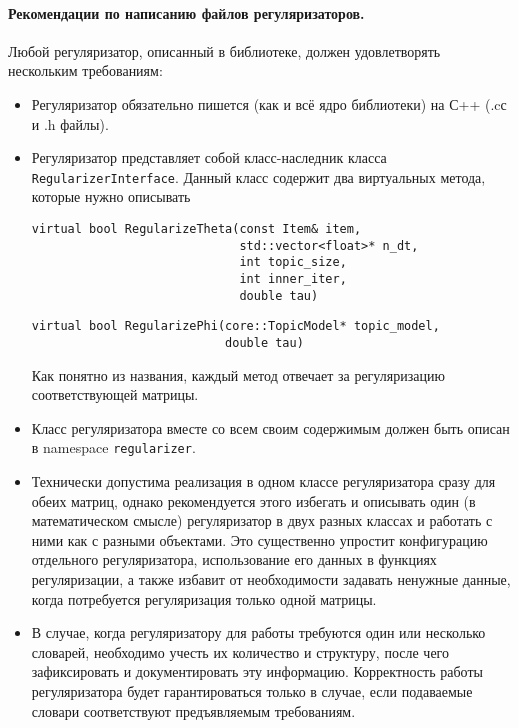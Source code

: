 \paragraph{Рекомендации по написанию файлов регуляризаторов.} Любой регуляризатор, описанный в библиотеке, должен удовлетворять нескольким требованиям:

\begin{itemize}
	\item Регуляризатор обязательно пишется (как и всё ядро библиотеки) на С++ (.cс и .h файлы).

	\item Регуляризатор представляет собой класс-наследник класса \verb'RegularizerInterface'. Данный класс содержит два виртуальных метода, которые нужно описывать
	
	\vspace{10pt}
	\verb|virtual bool RegularizeTheta(const Item& item, | \\
	\verb|                             std::vector<float>* n_dt,| \\
	\verb|                             int topic_size,| \\
	\verb|                             int inner_iter,| \\
	\verb|                             double tau)|
	
	\verb|virtual bool RegularizePhi(core::TopicModel* topic_model, | \\
	\verb|                           double tau)|
	\vspace{10pt}
	
	Как понятно из названия, каждый метод отвечает за регуляризацию соответствующей матрицы.
	
	\item Класс регуляризатора вместе со всем своим содержимым должен быть описан в namespace \verb'regularizer'.
	
	\item Технически допустима реализация в одном классе регуляризатора сразу для обеих матриц, однако рекомендуется этого избегать и описывать один (в математическом смысле) регуляризатор в двух разных классах и работать с ними как с разными объектами. Это существенно упростит конфигурацию отдельного регуляризатора, использование его данных в функциях регуляризации, а также избавит от необходимости задавать ненужные данные, когда потребуется регуляризация только одной матрицы.
	
	\item В случае, когда регуляризатору для работы требуются один или несколько словарей, необходимо учесть их количество и структуру, после чего зафиксировать и документировать эту информацию. Корректность работы регуляризатора будет гарантироваться только в случае, если подаваемые словари соответствуют предъявляемым требованиям.
	

\end{itemize}
